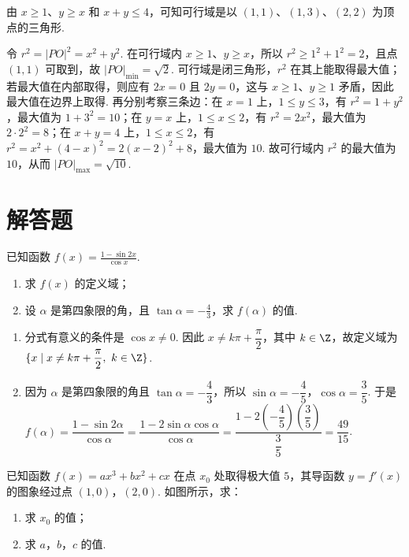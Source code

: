 \begin{solution}
由 \(x\geqslant1\)、\(y\geqslant x\) 和 \(x+y\leqslant4\)，可知可行域是以 \((1,1)\)、\((1,3)\)、\((2,2)\) 为顶点的三角形.

令 \(r^2=|PO|^2=x^2+y^2\). 在可行域内 \(x\geqslant1\)、\(y\geqslant x\)，所以 \(r^2\geqslant1^2+1^2=2\)，且点 \((1,1)\) 可取到，故 \(|PO|_{\min}=\sqrt{2}\). 可行域是闭三角形，\(r^2\) 在其上能取得最大值；若最大值在内部取得，则应有 \(2x=0\) 且 \(2y=0\)，这与 \(x\geqslant1\)、\(y\geqslant1\) 矛盾，因此最大值在边界上取得. 再分别考察三条边：在 \(x=1\) 上，\(1\leqslant y\leqslant3\)，有 \(r^2=1+y^2\)，最大值为 \(1+3^2=10\)；在 \(y=x\) 上，\(1\leqslant x\leqslant2\)，有 \(r^2=2x^2\)，最大值为 \(2\cdot2^2=8\)；在 \(x+y=4\) 上，\(1\leqslant x\leqslant2\)，有 \(r^2=x^2+(4-x)^2=2(x-2)^2+8\)，最大值为 \(10\). 故可行域内 \(r^2\) 的最大值为 \(10\)，从而 \(|PO|_{\max}=\sqrt{10}\).
\end{solution}

\section{解答题}
\begin{problem}
已知函数 \( f(x) = \frac{1 - \sin 2x}{\cos x} \).

\begin{enumerate}
\item 求 \( f(x) \) 的定义域；
\item 设 \(\alpha\) 是第四象限的角，且 \(\tan \alpha = -\frac{4}{3}\)，求 \(f(\alpha)\) 的值.
\end{enumerate}
\end{problem}

\begin{solution}
\begin{enumerate}
\item 分式有意义的条件是 \(\cos x\ne0\). 因此 \(x\ne k\pi+\dfrac{\pi}{2}\)，其中 \(k\in\Z\)，故定义域为 \(\{x\mid x\ne k\pi+\dfrac{\pi}{2},\ k\in\Z\}\).
\item 因为 \(\alpha\) 是第四象限的角且 \(\tan\alpha=-\dfrac43\)，所以 \(\sin\alpha=-\dfrac45\)，\(\cos\alpha=\dfrac35\). 于是
\(f(\alpha)=\dfrac{1-\sin2\alpha}{\cos\alpha}=\dfrac{1-2\sin\alpha\cos\alpha}{\cos\alpha}=\dfrac{1-2\left(-\dfrac45\right)\left(\dfrac35\right)}{\dfrac35}=\dfrac{49}{15}\).
\end{enumerate}
\end{solution}

\begin{problem}
已知函数 \( f(x) = ax^3 + bx^2 + cx \) 在点 \( x_0 \) 处取得极大值 \(5\)，其导函数 \( y = f'(x) \) 的图象经过点 \((1,0)\)，\((2,0)\). 如图所示，求：

\begin{enumerate}
\item 求 \(x_0\) 的值；
\item 求 \(a\)，\(b\)，\(c\) 的值.
\end{enumerate}

\end{problem}

